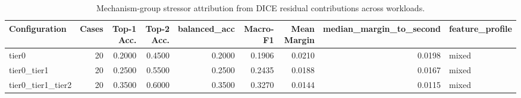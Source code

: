 \begin{table}[t]
\centering
\caption{Mechanism-group stressor attribution from DICE residual contributions across workloads.}
\label{tab:dice_stressor_diagnosis}
\footnotesize
\begin{tabular}{lrrrrrrrl}
\toprule
Configuration & Cases & Top-1 Acc. & Top-2 Acc. & balanced_acc & Macro-F1 & Mean Margin & median_margin_to_second & feature_profile \\
\midrule
tier0 & 20 & 0.2000 & 0.4500 & 0.2000 & 0.1906 & 0.0210 & 0.0198 & mixed \\
tier0_tier1 & 20 & 0.2500 & 0.5500 & 0.2500 & 0.2435 & 0.0188 & 0.0167 & mixed \\
tier0_tier1_tier2 & 20 & 0.3500 & 0.6000 & 0.3500 & 0.3270 & 0.0144 & 0.0115 & mixed \\
\bottomrule
\end{tabular}

\end{table}

